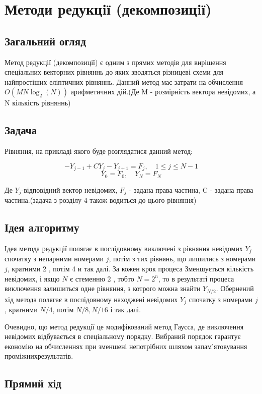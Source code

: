 \chapter{Методи редукцiї (декомпозицiї)}

\section{Загальний огляд}

Метод редукції (декомпозиції) є одним з прямих методів для 
вирішення спеціальних векторних рівняннь до яких зводяться 
різницеві схеми для найпростіших еліптичних рівняннь. Данний метод має 
затрати на обчислення $O(MN\log_2(N))$ арифметичних дій.(Де M - розмірність 
вектора невідомих, а N кількість рівняннь)

\section{Задача}

Рівняння, на прикладі якого буде розглядатися данний метод:

$$-Y_{j-1} +CY_j - Y_{j+1} =F_j, \quad 1\le j \le N-1$$
$$Y_0 = F_0, \quad Y_N = F_N$$

Де $Y_j$-відповідний вектор невідомих, $F_j$ - задана права частина, 
C - задана права частина.(задача з розділу 4 також водиться до цього рівняння)

\section{Ідея алгоритму}

Ідея метода редукції полягає в послідовному виключені з рівняння невідомих 
$Y_j$ спочатку з непарними номерами $j$, потім з тих рівнянь, 
що лишились з номерами $j$, кратними 2 , потім 4 и так далі. За кожен крок 
процеса  Зменшується кількість невідомих, і якщо $N$ є стеменню 2 , тобто 
$N=2^n$, то в результаті процеса виключення залишиться одне рівняння, з 
котрого можна знайти $Y_{N / 2}$. 
Обернений хід метода полягає в послідовному находжені невідомих $Y_j$ 
спочатку з номерами $j$, кратними $N / 4$, потім $N / 8, N / 16$ і так далі.


Очевидно, що метод редукції це модифікований метод Гаусса, де виключення 
невідомих відбувається в спеціальному порядку. Вибраний порядок гарантує 
економію на обчисленнях при зменшені непотрібних шляхом запам'ятовування 
проміжнихрезультатів.

\section{Прямий хід}

